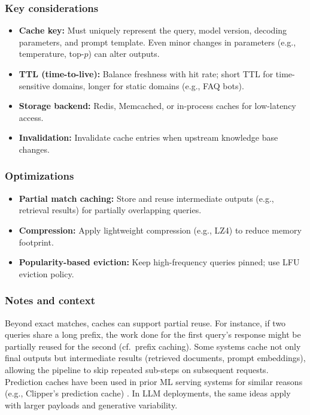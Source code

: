 \subsubsection{Key considerations}
\begin{itemize}
    \item \textbf{Cache key:} Must uniquely represent the query, model version, decoding parameters, and prompt template. Even minor changes in parameters (e.g., temperature, top-$p$) can alter outputs.
    \item \textbf{TTL (time-to-live):} Balance freshness with hit rate; short TTL for time-sensitive domains, longer for static domains (e.g., FAQ bots).
    \item \textbf{Storage backend:} Redis, Memcached, or in-process caches for low-latency access.
    \item \textbf{Invalidation:} Invalidate cache entries when upstream knowledge base changes.
\end{itemize}

\subsubsection{Optimizations}
\begin{itemize}
    \item \textbf{Partial match caching:} Store and reuse intermediate outputs (e.g., retrieval results) for partially overlapping queries.
    \item \textbf{Compression:} Apply lightweight compression (e.g., LZ4) to reduce memory footprint.
    \item \textbf{Popularity-based eviction:} Keep high-frequency queries pinned; use LFU eviction policy.
\end{itemize}

\subsubsection{Notes and context}
Beyond exact matches, caches can support partial reuse. For instance, if two queries share a long prefix, the work done for the first query’s response might be partially reused for the second (cf.\ prefix caching). Some systems cache not only final outputs but intermediate results (retrieved documents, prompt embeddings), allowing the pipeline to skip repeated sub-steps on subsequent requests. Prediction caches have been used in prior ML serving systems for similar reasons (e.g., Clipper’s prediction cache) \cite{rise.cs.berkeley.edu}. In LLM deployments, the same ideas apply with larger payloads and generative variability.

